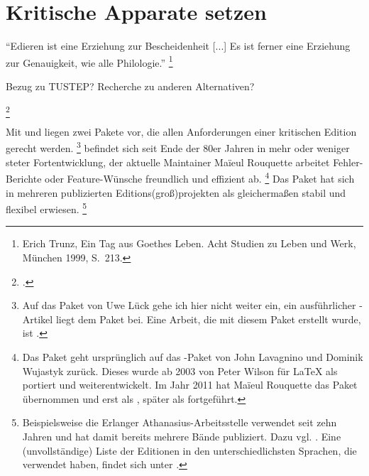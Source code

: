 \chapter{Kritische Apparate setzen}

 
\label{reledmac}

\enquote{Edieren ist eine Erziehung zur Bescheidenheit [...] Es ist ferner eine Erziehung zur 
Genauigkeit, wie alle Philologie.}%
\footnote{Erich Trunz, Ein Tag aus Goethes Leben. Acht Studien zu Leben und Werk, München 1999, S.~213.}

Bezug zu TUSTEP?
Recherche zu anderen Alternativen?

\footcite[165\psqq]{rouquette:2012}

\cite{stockhausen:welten}

Mit  und  liegen zwei Pakete vor, die allen Anforderungen einer kritischen Edition gerecht werden.%
\footnote{%
	Auf das Paket  von Uwe Lück gehe ich hier nicht weiter ein, ein ausführlicher \TUGboat-Artikel liegt dem Paket bei. Eine Arbeit, die mit diesem Paket erstellt wurde, ist \cite{mariev:joh_ant}.}
 befindet sich seit Ende der 80er Jahren in mehr oder weniger steter Fortentwicklung, der aktuelle Maintainer Maïeul Rouquette arbeitet Fehler-Berichte oder Feature-Wünsche freundlich und effizient ab.%
\footnote{%
	Das Paket  \cite{reledmac} geht ursprünglich auf das \plainTeX{}-Paket  von John Lavagnino und Dominik Wujastyk zurück. Dieses wurde ab 2003 von Peter Wilson für \LaTeX{} als  portiert und weiterentwickelt. Im Jahr 2011 hat Maïeul Rouquette das Paket übernommen und erst als , später als  fortgeführt.}
Das Paket hat sich in mehreren publizierten Editions(groß)projekten als gleichermaßen stabil und flexibel erwiesen.%
\footnote{%
	Beispielsweise die Erlanger Athanasius-Arbeitsstelle verwendet seit zehn Jahren  und hat damit bereits mehrere Bände publiziert. Dazu vgl. \cite{stockhausen:welten}. Eine (unvollständige) Liste der Editionen in den unterschiedlichsten Sprachen, die  verwendet haben, findet sich unter \cite{reledmac-benutzung}.}